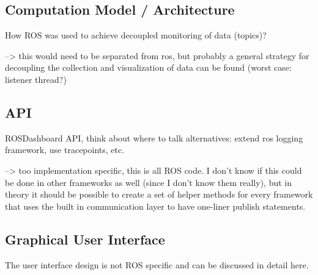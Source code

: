 \subsection{Computation Model / Architecture}
How ROS was used to achieve decoupled monitoring of data (topics)?

--> this would need to be separated from ros, but probably a general strategy for decoupling the collection and visualization of data can be found (worst case: listener thread?)
\subsection{API}
ROSDashboard API, think about where to talk alternatives: extend ros logging framework, use tracepoints, etc.

--> too implementation specific, this is all ROS code. I don't know if this could be done in other frameworks as well (since I don't know them really), but in theory it should be possible to create a set of helper methods for every framework that uses the built in communication layer to have one-liner publish statements.
\subsection{Graphical User Interface}
The user interface design is not ROS specific and can be discussed in detail here.
